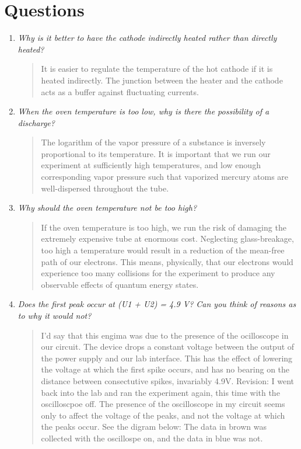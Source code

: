 \documentclass{amsart}
\begin{document}
\medskip

\pagebreak

\section{Questions}

\begin{enumerate}
\item {\textit{Why is it better to have the cathode indirectly heated rather than directly heated?}
\begin{quote}
It is easier to regulate the temperature of the hot cathode if it is heated indirectly. The junction between the heater and the cathode acts as a buffer against fluctuating currents.
\end{quote}}

\item{\textit{When the oven temperature is too low, why is there the possibility of a discharge?}
\begin{quote}
The logarithm of the vapor pressure of a substance is inversely proportional to its temperature. It is important that we run our experiment at sufficiently high temperatures, and low enough corresponding vapor pressure such that vaporized mercury atoms are well-dispersed throughout the tube.
\end{quote}}

\item{\textit{Why should the oven temperature not be too high?}
\begin{quote}
If the oven temperature is too high, we run the risk of damaging the extremely expensive tube at enormous cost. Neglecting glass-breakage, too high a temperature would result in a reduction of the mean-free path of our electrons. This means, physically, that our electrons would experience too many collisions for the experiment to produce any observable effects of quantum energy states.
\end{quote}}

\item{\textit{Does the first peak occur at (U1 + U2) = 4.9 V? Can you think of reasons as to why it would not?}
\begin{quote}
I'd say that this engima was due to the presence of the ocilloscope in our circuit. The device drops a constant voltage between the output of the power supply and our lab interface. This has the effect of lowering the voltage at which the first spike occurs, and has no bearing on the distance between consectutive spikes, invariably 4.9V.
Revision: I went back into the lab and ran the experiment again, this time with the oscilloscpoe off. The presence of the oscilloscope in my circuit seems only to affect the voltage of the peaks, and not the voltage at which the peaks occur. See the digram below: The data in brown was collected with the oscillospe on, and the data in blue was not.


\end{quote}}
\end{enumerate}
\end{document}
